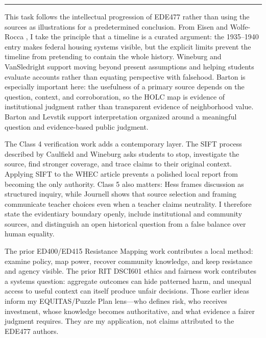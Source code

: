 \documentclass[11pt]{article}
\newcommand{\projectsection}[1]{\par\Needspace{5\baselineskip}\addvspace{0.10in}\noindent{\Large\bfseries\color{PrimaryRed}#1}\par\vspace{0.02in}\color{DeepNavy}\hrule\color{black}\vspace{0.08in}}
\begin{document}
\projectsection{4. Course Learning and Prior-Work Integration}
This task follows the intellectual progression of EDE477 rather than using the sources as illustrations for a predetermined conclusion. From Eisen and Wolfe-Rocca \cite{eisenWolfeRocca2023}, I take the principle that a timeline is a curated argument: the 1935--1940 entry makes federal housing systems visible, but the explicit limits prevent the timeline from pretending to contain the whole history. Wineburg \cite{wineburg2001} and VanSledright \cite{vanSledright2015} support moving beyond present assumptions and helping students evaluate accounts rather than equating perspective with falsehood. Barton \cite{barton2005} is especially important here: the usefulness of a primary source depends on the question, context, and corroboration, so the HOLC map is evidence of institutional judgment rather than transparent evidence of neighborhood value. Barton and Levstik \cite{bartonLevstik2015} support interpretation organized around a meaningful question and evidence-based public judgment.

The Class 4 verification work adds a contemporary layer. The SIFT process described by Caulfield and Wineburg \cite{caulfieldWineburg2025} asks students to stop, investigate the source, find stronger coverage, and trace claims to their original context. Applying SIFT to the WHEC article prevents a polished local report from becoming the only authority. Class 5 also matters: Hess \cite{hess2015} frames discussion as structured inquiry, while Journell \cite{journell2020} shows that source selection and framing communicate teacher choices even when a teacher claims neutrality. I therefore state the evidentiary boundary openly, include institutional and community sources, and distinguish an open historical question from a false balance over human equality.

The prior ED400/ED415 Resistance Mapping work \cite{garciaResistanceMapping2025} contributes a local method: examine policy, map power, recover community knowledge, and keep resistance and agency visible. The prior RIT DSCI601 ethics and fairness work \cite{garciaDSCI6012026} contributes a systems question: aggregate outcomes can hide patterned harm, and unequal access to useful context can itself produce unfair decisions. Those earlier ideas inform my EQUITAS/Puzzle Plan lens---who defines risk, who receives investment, whose knowledge becomes authoritative, and what evidence a fairer judgment requires. They are my application, not claims attributed to the EDE477 authors.
\end{document}

